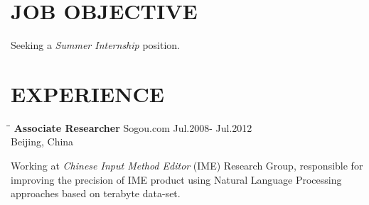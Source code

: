 \documentclass{res}
\begin{document}
 


\address{\bf  ADDRESS\\Donald Bren Hall, Room 3019\\University of California,Irvine\\Irvine,CA 92967}
\address{\bf  CONTACT\\jianfeng.jia@gmail.com\\jianfeng.jia@uci.edu\\(949) 678-9893}
                                  
\begin{resume}

\section{JOB OBJECTIVE}          
    Seeking a \emph{Summer Internship} position.

\section{EXPERIENCE}
   \vspace{-0.1in}	
   \begin{tabbing}
   \hspace{2.3in}\= \hspace{2.6in}\= \kill %
    {\bf Associate Researcher} \>Sogou.com     \>Jul.2008- Jul.2012\\
                             \>Beijing, China
   \end{tabbing}\vspace{-20pt}      %
   Working at \emph{Chinese Input Method Editor} (IME) Research Group,
    responsible for improving the precision of IME product using Natural Language Processing approaches based on terabyte data-set. \\


\end{resume}
\end{document}
